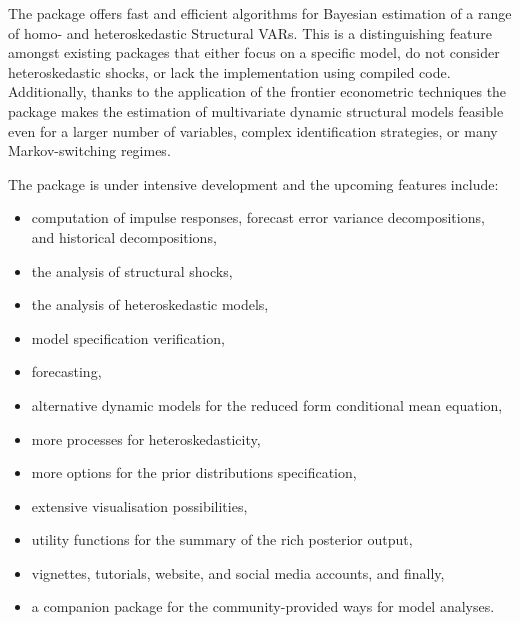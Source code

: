 \documentclass[
  nojss]{jss}
\providecommand{\tightlist}{%
  \setlength{\itemsep}{0pt}\setlength{\parskip}{0pt}}
\begin{document}
The  package offers fast and efficient algorithms for
Bayesian estimation of a range of homo- and heteroskedastic Structural
VARs. This is a distinguishing feature amongst existing 
packages that either focus on a specific model, do not consider
heteroskedastic shocks, or lack the implementation using compiled code.
Additionally, thanks to the application of the frontier econometric
techniques the package makes the estimation of multivariate dynamic
structural models feasible even for a larger number of variables,
complex identification strategies, or many Markov-switching regimes.

The package is under intensive development and the upcoming features
include:

\begin{itemize}
\tightlist
\item
  computation of impulse responses, forecast error variance
  decompositions, and historical decompositions,
\item
  the analysis of structural shocks,
\item
  the analysis of heteroskedastic models,
\item
  model specification verification,
\item
  forecasting,
\item
  alternative dynamic models for the reduced form conditional mean
  equation,
\item
  more processes for heteroskedasticity,
\item
  more options for the prior distributions specification,
\item
  extensive visualisation possibilities,
\item
  utility functions for the summary of the rich posterior output,
\item
  vignettes, tutorials, website, and social media accounts, and finally,
\item
  a companion package for the community-provided ways for model
  analyses.
\end{itemize}

\newpage


\end{document}
